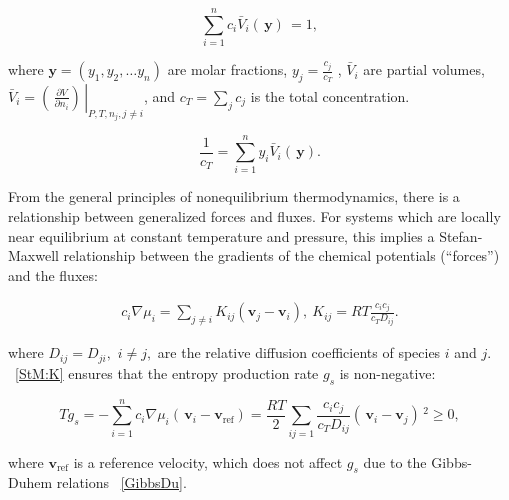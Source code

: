 \documentclass[../main.tex]{subfiles}
\begin{document}
\begin{equation}
    \displaystyle\sum_{i=1}^n c_i \bar{V}_i ( \, \mathbf{y} ) \, =1,
\end{equation}

\noindent where $\mathbf{y} = (y_1, y_2, \ldots y_n)$ are molar fractions,  $y_j = \frac{c_j}{c_T}$ , $\bar{V}_i$ are partial volumes, $\bar{V}_i = \left. \left(\, \displaystyle\frac{\partial V}{\partial n_i} \right)\, \right\vert_{P,T, n_j,j\neq i}$,  and $c_T = \sum_j c_j$ is the total concentration.

\begin{equation}
    \displaystyle \frac{1}{c_T} = \displaystyle\sum_{i=1}^n y_i \bar{V}_i ( \, \mathbf{y} ) .
    \label{cT}
\end{equation}

From the general principles of nonequilibrium thermodynamics, there is a relationship between generalized forces and fluxes. For systems which are locally near equilibrium at constant temperature and pressure, this implies a Stefan-Maxwell relationship between the gradients of the chemical potentials (``forces'')  and the fluxes:

\begin{equation} \begin{array}{l}
    \displaystyle c_i \nabla \mu_i = \displaystyle \sum_{j\neq i}  K_{ij} (\mathbf{v}_j - \mathbf{v}_i), \
    K_{ij}= R  T  \frac{c_i c_j }{c_T D_{ij}}.
    \label{StM:K}
\end{array} \end{equation}

\noindent where $D_{ij}= D_{ji},$ $i \neq j,$ are the relative diffusion coefficients of species $i$ and $j$. ~\ref{StM:K}  ensures that the entropy production rate $g_s$ is non-negative:

\begin{equation}
    T g_s = - \sum_{i=1}^n c_i \nabla \mu_i ( \, \mathbf{v}_i - \mathbf{v}_{\mbox{ref}} ) = \frac{R  T}{2} \displaystyle\sum_{ij=1}  \frac{c_i c_j}{c_T D_{ij}} ( \, \mathbf{v}_i -\mathbf{v}_j ) \,^2 \geq 0 ,
    \label{gs}
\end{equation}

\noindent where $\mathbf{v}_{\mbox{ref}}$ is a reference velocity, which does not affect $g_s$ due to the Gibbs-Duhem relations ~\ref{GibbsDu}.

\end{document}

